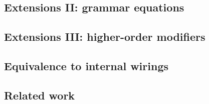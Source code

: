 
\begin{example}

\end{example}


\begin{example}

\end{example}

\subsection{Extensions II: grammar equations}


\begin{example}

\end{example}


\begin{example}

\end{example}


\begin{example}

\end{example}

\subsection{Extensions III: higher-order modifiers}


\begin{example}

\end{example}


\begin{example}

\end{example}

\subsection{Equivalence to internal wirings}

\subsection{Related work}